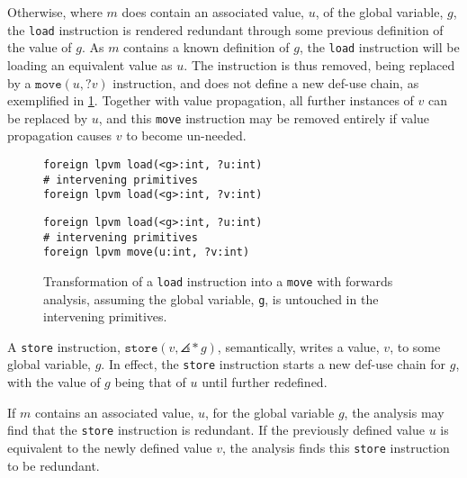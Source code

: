 Otherwise, where $m$ does contain an associated value, $u$, of the global variable, $g$, the \texttt{load} instruction is rendered redundant through some previous definition of the value of $g$. As $m$ contains a known definition of $g$, the \texttt{load} instruction will be loading an equivalent value as $u$. The instruction is thus removed, being replaced by a $\mathtt{move}(u, ?v)$ instruction, and does not define a new def-use chain, as exemplified in \cref{lst:fwd-opt-load}. Together with value propagation, all further instances of $v$ can be replaced by $u$, and this \texttt{move} instruction may be removed entirely if value propagation causes $v$ to become un-needed. 

\begin{figure}[ht]
  \begin{minipage}[t]{.48\textwidth}
    \begin{lstlisting}
foreign lpvm load(<g>:int, ?u:int)
# intervening primitives
foreign lpvm load(<g>:int, ?v:int)
\end{lstlisting}
  \end{minipage}\hfill
  \begin{minipage}[t]{.48\textwidth}
    \begin{lstlisting}[numbers=none]
foreign lpvm load(<g>:int, ?u:int)
# intervening primitives
foreign lpvm move(u:int, ?v:int)
\end{lstlisting}
  \end{minipage}
  \caption[Transformation of a \texttt{load} instruction into a \texttt{move} with forwards analysis.]{Transformation of a \texttt{load} instruction into a \texttt{move} with forwards analysis, assuming the global variable, \texttt{g}, is untouched in the intervening primitives.}
  \label{lst:fwd-opt-load}
\end{figure}

A \texttt{store} instruction, $\mathtt{store}(v, \angles*{g})$, semantically, writes a value, $v$, to some global variable, $g$. In effect, the \texttt{store} instruction starts a new def-use chain for $g$, with the value of $g$ being that of $u$ until further redefined. 

If $m$ contains an associated value, $u$, for the global variable $g$, the analysis may find that the \texttt{store} instruction is redundant. If the previously defined value $u$ is equivalent to the newly defined value $v$, the analysis finds this \texttt{store} instruction to be redundant. 

